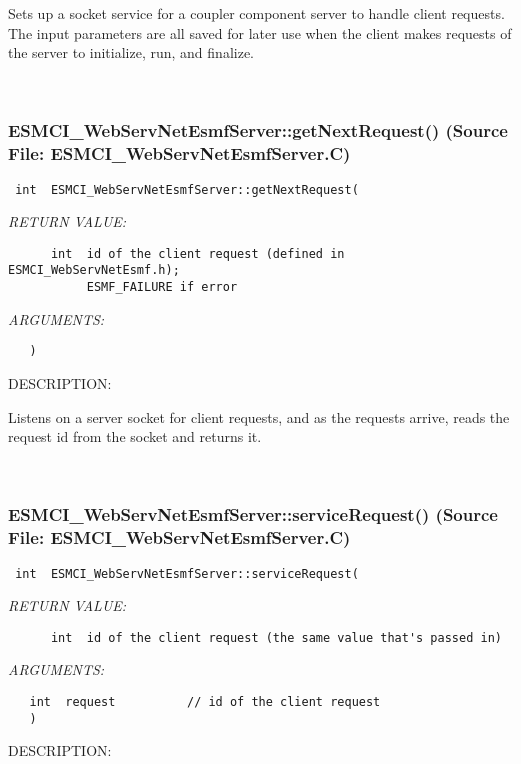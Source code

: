       Sets up a socket service for a coupler component server to handle client
      requests.  The input parameters are all saved for later use when the
      client makes requests of the server to initialize, run, and finalize.
   
 
\mbox{}\hrulefill\
 
\subsubsection{ESMCI\_WebServNetEsmfServer::getNextRequest() (Source File: ESMCI\_WebServNetEsmfServer.C)}


  
\begin{verbatim} int  ESMCI_WebServNetEsmfServer::getNextRequest(\end{verbatim}{\em RETURN VALUE:}
\begin{verbatim}      int  id of the client request (defined in ESMCI_WebServNetEsmf.h);
           ESMF_FAILURE if error\end{verbatim}{\em ARGUMENTS:}
\begin{verbatim}   )\end{verbatim}
{\sf DESCRIPTION:\\ }


      Listens on a server socket for client requests, and as the requests
      arrive, reads the request id from the socket and returns it.
   
 
\mbox{}\hrulefill\
 
\subsubsection{ESMCI\_WebServNetEsmfServer::serviceRequest() (Source File: ESMCI\_WebServNetEsmfServer.C)}


  
\begin{verbatim} int  ESMCI_WebServNetEsmfServer::serviceRequest(\end{verbatim}{\em RETURN VALUE:}
\begin{verbatim}      int  id of the client request (the same value that's passed in)\end{verbatim}{\em ARGUMENTS:}
\begin{verbatim}   int  request          // id of the client request
   )\end{verbatim}
{\sf DESCRIPTION:\\ }


